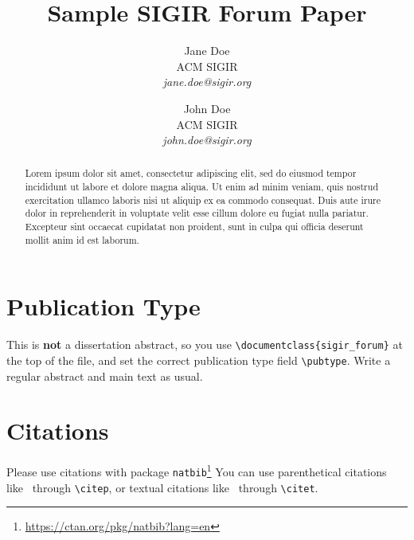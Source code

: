 \documentclass[]{sigir_forum}
\begin{document}
\title{Sample SIGIR Forum Paper}

\author{
Jane Doe\\ACM SIGIR\\\emph{jane.doe@sigir.org}
\and
John Doe\\ACM SIGIR\\\emph{john.doe@sigir.org}
}

\maketitle 
\begin{abstract}
Lorem ipsum dolor sit amet, consectetur adipiscing elit, sed do eiusmod tempor incididunt ut labore et dolore magna aliqua. Ut enim ad minim veniam, quis nostrud exercitation ullamco laboris nisi ut aliquip ex ea commodo consequat. Duis aute irure dolor in reprehenderit in voluptate velit esse cillum dolore eu fugiat nulla pariatur. Excepteur sint occaecat cupidatat non proident, sunt in culpa qui officia deserunt mollit anim id est laborum.
\end{abstract}

\section{Publication Type}

This is \textbf{not} a dissertation abstract, so you use \texttt{\textbackslash documentclass\{sigir\_forum\}} at the top of the file, and set the correct publication type field \texttt{\textbackslash pubtype}. Write a regular abstract and main text as usual.

\section{Citations}

Please use citations with package \texttt{natbib}\footnote{\url{https://ctan.org/pkg/natbib?lang=en}}
You can use parenthetical citations like~\citep{forum} through \texttt{\textbackslash citep}, or textual citations like~\citet{forum} through \texttt{\textbackslash citet}.


\end{document}
